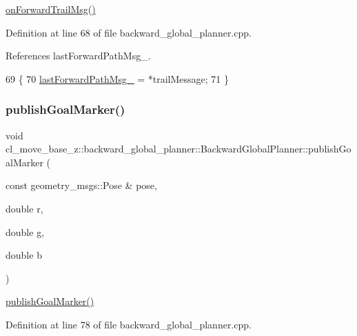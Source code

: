 \hyperlink{classcl__move__base__z_1_1backward__global__planner_1_1BackwardGlobalPlanner_a515bde5bfb3ae548f3e19209df1a48b0}{on\+Forward\+Trail\+Msg()} 

Definition at line 68 of file backward\+\_\+global\+\_\+planner.\+cpp.



References last\+Forward\+Path\+Msg\+\_\+.


\begin{DoxyCode}
69 \{
70     \hyperlink{classcl__move__base__z_1_1backward__global__planner_1_1BackwardGlobalPlanner_a149ee7d22d98271c9ee1da55241d500b}{lastForwardPathMsg\_} = *trailMessage;
71 \}
\end{DoxyCode}
\mbox{\label{classcl__move__base__z_1_1backward__global__planner_1_1BackwardGlobalPlanner_a3c6784cad10fdadf28323380fe3d6d2b}} 
\subsubsection{\texorpdfstring{publish\+Goal\+Marker()}{publishGoalMarker()}}
{\footnotesize\ttfamily void cl\+\_\+move\+\_\+base\+\_\+z\+::backward\+\_\+global\+\_\+planner\+::\+Backward\+Global\+Planner\+::publish\+Goal\+Marker (\begin{DoxyParamCaption}\item[{const geometry\+\_\+msgs\+::\+Pose \&}]{pose,  }\item[{double}]{r,  }\item[{double}]{g,  }\item[{double}]{b }\end{DoxyParamCaption})\hspace{0.3cm}{\ttfamily [private]}}

\hyperlink{classcl__move__base__z_1_1backward__global__planner_1_1BackwardGlobalPlanner_a3c6784cad10fdadf28323380fe3d6d2b}{publish\+Goal\+Marker()} 

Definition at line 78 of file backward\+\_\+global\+\_\+planner.\+cpp.



